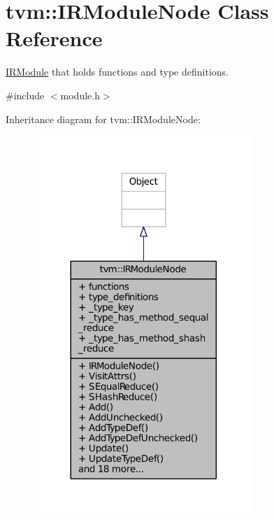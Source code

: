 \hypertarget{classtvm_1_1IRModuleNode}{}\section{tvm\+:\+:I\+R\+Module\+Node Class Reference}
\label{classtvm_1_1IRModuleNode}


\hyperlink{classtvm_1_1IRModule}{I\+R\+Module} that holds functions and type definitions.  




{\ttfamily \#include $<$module.\+h$>$}



Inheritance diagram for tvm\+:\+:I\+R\+Module\+Node\+:
\nopagebreak
\begin{figure}[H]
\begin{center}
\leavevmode
\includegraphics[width=236pt]{classtvm_1_1IRModuleNode__inherit__graph}
\end{center}
\end{figure}



